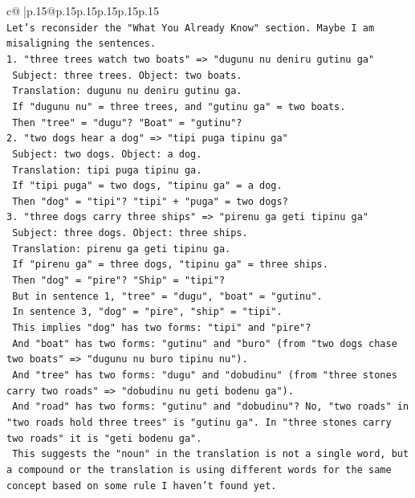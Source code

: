 \documentclass{article}
\begin{document}
{\begin{supertabular}{c@{$\;$}|p{.15\linewidth}@{}p{.15\linewidth}p{.15\linewidth}p{.15\linewidth}p{.15\linewidth}p{.15\linewidth}}
{{{\\ 
\texttt{Let's reconsider the "What You Already Know" section. Maybe I am misaligning the sentences.} \\
\texttt{1. "three trees watch two boats" => "dugunu nu deniru gutinu ga"} \\
\texttt{   Subject: three trees. Object: two boats.} \\
\texttt{   Translation: dugunu nu deniru gutinu ga.} \\
\texttt{   If "dugunu nu" = three trees, and "gutinu ga" = two boats.} \\
\texttt{   Then "tree" = "dugu"? "Boat" = "gutinu"?} \\
\texttt{2. "two dogs hear a dog" => "tipi puga tipinu ga"} \\
\texttt{   Subject: two dogs. Object: a dog.} \\
\texttt{   Translation: tipi puga tipinu ga.} \\
\texttt{   If "tipi puga" = two dogs, "tipinu ga" = a dog.} \\
\texttt{   Then "dog" = "tipi"? "tipi" + "puga" = two dogs?} \\
\texttt{3. "three dogs carry three ships" => "pirenu ga geti tipinu ga"} \\
\texttt{   Subject: three dogs. Object: three ships.} \\
\texttt{   Translation: pirenu ga geti tipinu ga.} \\
\texttt{   If "pirenu ga" = three dogs, "tipinu ga" = three ships.} \\
\texttt{   Then "dog" = "pire"? "Ship" = "tipi"?} \\
\texttt{   But in sentence 1, "tree" = "dugu", "boat" = "gutinu".} \\
\texttt{   In sentence 3, "dog" = "pire", "ship" = "tipi".} \\
\texttt{   This implies "dog" has two forms: "tipi" and "pire"?} \\
\texttt{   And "boat" has two forms: "gutinu" and "buro" (from "two dogs chase two boats" => "dugunu nu buro tipinu nu").} \\
\texttt{   And "tree" has two forms: "dugu" and "dobudinu" (from "three stones carry two roads" => "dobudinu nu geti bodenu ga").} \\
\texttt{   And "road" has two forms: "gutinu" and "dobudinu"? No, "two roads" in "two roads hold three trees" is "gutinu ga". In "three stones carry two roads" it is "geti bodenu ga".} \\
\texttt{   This suggests the "noun" in the translation is not a single word, but a compound or the translation is using different words for the same concept based on some rule I haven't found yet.} \\
}}}
\end{supertabular}}
\end{document}
